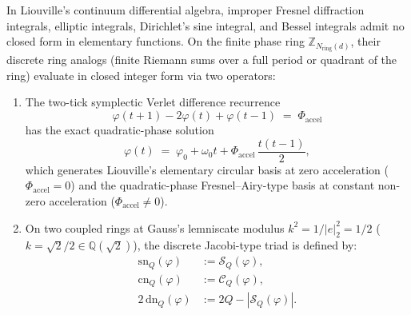 \documentclass[11pt,a4paper]{article}
\theoremstyle{plain}
\theoremstyle{definition}
\begin{document}
In Liouville's continuum differential algebra, improper Fresnel diffraction integrals, elliptic integrals, Dirichlet's sine integral, and Bessel integrals admit no closed form in elementary functions. On the finite phase ring $\mathbb{Z}_{N_{\mathrm{ring}}(d)}$, their discrete ring analogs (finite Riemann sums over a full period or quadrant of the ring) evaluate in closed integer form via two operators:
\begin{enumerate}[leftmargin=*]
\item The two-tick symplectic Verlet difference recurrence
  \begin{equation}
    \label{eq:verlet-recurrence}
    \varphi(t+1) - 2\varphi(t) + \varphi(t-1) \;=\; \Phi_{\mathrm{accel}}
  \end{equation}
  has the exact quadratic-phase solution
  \begin{equation}
    \label{eq:verlet-parabola}
    \varphi(t) \;=\; \varphi_0 + \omega_0 t + \Phi_{\mathrm{accel}}\,\frac{t(t-1)}{2},
  \end{equation}
  which generates Liouville's elementary circular basis at zero acceleration ($\Phi_{\mathrm{accel}} = 0$) and the quadratic-phase Fresnel--Airy-type basis at constant non-zero acceleration ($\Phi_{\mathrm{accel}} \ne 0$).
\item On two coupled rings at Gauss's lemniscate modulus $k^2 = 1/|e|_2^2 = 1/2$ ($k = \sqrt{2}/2 \in \mathbb{Q}(\sqrt{2})$), the discrete Jacobi-type triad is defined by:
  \begin{align}
    \mathrm{sn}_Q(\varphi) &:= \mathcal{S}_Q(\varphi), \label{eq:jacobi-sn} \\
    \mathrm{cn}_Q(\varphi) &:= \mathcal{C}_Q(\varphi), \label{eq:jacobi-cn} \\
    2\,\mathrm{dn}_Q(\varphi) &:= 2Q - |\mathcal{S}_Q(\varphi)|. \label{eq:jacobi-dn}
  \end{align}
\end{enumerate}
\end{document}
